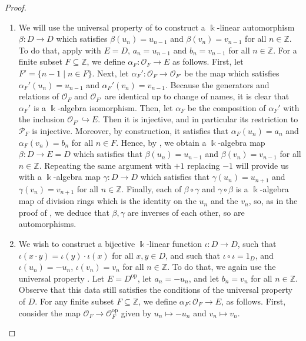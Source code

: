 \documentclass{amsart}
\theoremstyle{definition}
\newcommand{\inj}{\hookrightarrow}
\newcommand{\opn}{\operatorname}
\renewcommand{\k}{\Bbbk}
\numberwithin{equation}{section}
\begin{document}
\begin{proof}
\begin{enumerate}
\begin{enumerate}
\end{enumerate}
\item We will use the universal property of  to construct a $\k$-linear automorphism $\beta:D \to D$ which satisfies $\beta(u_n) = u_{n-1}$ and $\beta(v_n) = v_{n-1}$ for all $n \in \mathbb{Z}$.
To do that, apply  with $E = D$,
$a_n = u_{n-1}$ and $b_n = v_{n-1}$ for all $n \in \mathbb{Z}$.
For a finite subset $F \subseteq \mathbb{Z}$,
we define $\alpha_F :\mathcal{O}_F \to E$ as follows.
First, let $F' = \{n-1 \mid n \in F\}$.
Next, let $\alpha_F':\mathcal{O}_F \to \mathcal{O}_{F'}$ be the map
which satisfies $\alpha_F'(u_n) = u_{n-1}$ and $\alpha_F'(v_n) = v_{n-1}$. Because the generators and relations of $\mathcal{O}_F$ and $\mathcal{O}_{F'}$ are identical up to change of names,
it is clear that $\alpha_F'$ is a $\k$-algebra isomorphism.
Then, let $\alpha_F$ be the composition of $\alpha_F'$ with the inclusion $\mathcal{O}_{F'} \inj E$. Then it is injective,
and in particular its restriction to $\mathcal{P}_F$ is injective.
Moreover, by construction, it satisfies that $\alpha_F(u_n) = a_n$ and $\alpha_F(v_n) = b_n$ for all $n\in F$.
Hence, by ,
we obtain a $\k$-algebra map $\beta:D \to E=D$ which satisfies that $\beta(u_n)=u_{n-1}$ and $\beta(v_n) = v_{n-1}$ for all $n\in \mathbb{Z}$.
Repeating the same argument with $+1$ replacing $-1$ will provide us with a $\k$-algebra map $\gamma:D \to D$ which satisfies that $\gamma(u_n)=u_{n+1}$ and $\gamma(v_n) = v_{n+1}$ for all $n\in \mathbb{Z}$.
Finally, each of $\beta\circ \gamma$ and $\gamma\circ \beta$ is a $\k$-algebra map of division rings which is the identity on the $u_n$ and the $v_n$, so, as in the proof of ,
we deduce that $\beta, \gamma$ are inverses of each other, so are automorphisms.
\item We wish to construct a bijective $\k$-linear function $\iota:D \to D$,
such that $\iota(x\cdot y) = \iota(y)\cdot \iota(x)$ for all $x,y \in D$,
and such that $\iota\circ \iota = 1_D$, and $\iota(u_n) = -u_n$, $\iota(v_n) = v_n$ for all $n \in \mathbb{Z}$.
To do that, we again use the universal property .
Let $E = D^{\opn{op}}$,
let $a_n = -u_n$, and let $b_n = v_n$ for all $n \in \mathbb{Z}$.
Observe that this data still satisfies the conditions of the universal property of $D$.
For any finite subset $F \subseteq \mathbb{Z}$,
we define $\alpha_F : \mathcal{O}_F \to E$,
as follows. 
First, consider the map $\mathcal{O}_F \to \mathcal{O}_F^{\opn{op}}$ given by $u_n \mapsto -u_n$ and $v_n \mapsto v_n$. 

\end{enumerate}
\end{proof}
\end{document}
